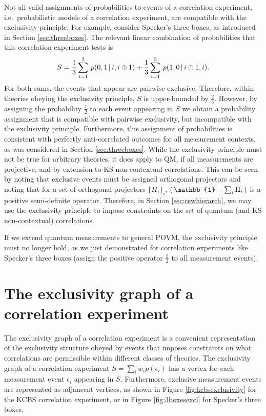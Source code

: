 Not all valid assignments of probabilities to events of a correlation experiment, i.e.\ probabilistic models of a correlation experiment, are compatible with the exclusivity principle. For example, consider Specker's three boxes, as introduced in Section \ref{sec:threeboxes}. The relevant linear combination of probabilities that this correlation experiment tests is
\begin{equation*}
S = \frac{1}{3}\sum_{i=1}^3\thinspace p(0,1 \thinspace\vert\thinspace i,i\oplus 1) +  \frac{1}{3}\sum_{i=1}^3\thinspace p(1,0\thinspace\vert\thinspace i\oplus 1,i).
\end{equation*}
For both sums, the events that appear are pairwise exclusive. Therefore, within theories obeying the exclusivity principle, $S$ is upper-bounded by $\frac{2}{3}$. However, by assigning the probability $\frac{1}{2}$ to each event appearing in $S$ we obtain a probability assignment that is compatible with pairwise exclusivity, but incompatible with the exclusivity principle. Furthermore, this assignment of probabilities is consistent with perfectly anti-correlated outcomes for all measurement contexts, as was considered in Section \ref{sec:threeboxes}.
While the exclusivity principle must not be true for arbitrary theories, it does apply to QM, if all measurements are projective, and by extension to KS non-contextual correlations. This can be seen by noting that exclusive events must be assigned orthogonal projectors and noting that for a set of orthogonal projectors $\{\Pi_i\}_i$, $(\thinspace\mathbb{1}-\sum_i \Pi_i\thinspace)$ is a positive semi-definite operator.
Therefore, in Section \ref{sec:cswhierarch}, we may use the exclusivity principle to impose constraints on the set of quantum (and KS non-contextual) correlations.

If we extend quantum measurements to general POVM, the exclusivity principle must no longer hold, as we just demonstrated for correlation experiments like Specker's three boxes (assign the positive operator $\frac{\mathbb{1}}{2}$ to all measurement events).

\section{The exclusivity graph of a correlation experiment}
The exclusivity graph of a correlation experiment is a convenient representation of the exclusivity structure obeyed by events that imposes constraints on what correlations are permissible within different classes of theories. 
The exclusivity graph of a correlation experiment $S=\sum_i w_i p(\epsilon_i)$ has a vertex for each measurement event $\epsilon_i$ appearing in $S$.  Furthermore, exclusive measurement events are represented as adjancent vertices, as shown in Figure \ref{fig:kcbsexclusivity} for the KCBS correlation experiment, or in Figure \ref{fig:3boxesexcl} for Specker's three boxes.


